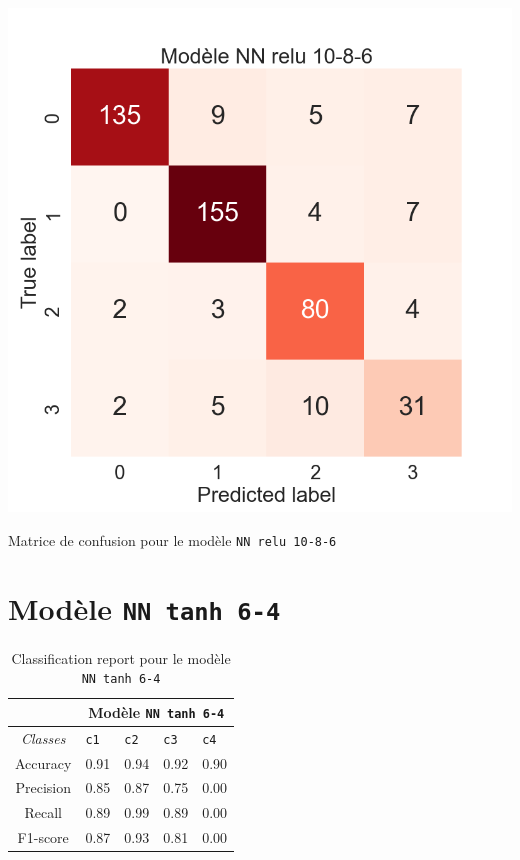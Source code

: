 \begin{table}[H]
    \includegraphics[scale=0.5]{images/y_pred_NN_relu_10-8-6.png}
    \caption{\label{HomePage} Matrice de confusion pour le modèle \texttt{NN relu 10-8-6}}
\end{table}

\newpage

\section{Modèle \texttt{NN tanh 6-4}}

\begin{table}[ht]
  \begin{tabular}{ m{5em} | m{1cm}| m{1cm} | m{1cm}| m{1cm} | } 
  \cline{2-5}
             & \multicolumn{4}{|c|}{Modèle \texttt{NN tanh 6-4}}\\
 \hline
 \multicolumn{1}{|c|}{\textit{Classes}} & \hfil \texttt{c1} & \hfil \texttt{c2} & \hfil \texttt{c3} & \hfil \texttt{c4} \\ 
  \hline
  \multicolumn{1}{|c|}{Accuracy} & \hfil 0.91 & \hfil 0.94 & \hfil 0.92 & \hfil 0.90 \\ 
  \hline
  \multicolumn{1}{|c|}{Precision} & \hfil 0.85 & \hfil 0.87 & \hfil 0.75 & \hfil 0.00 \\ 
  \hline
  \multicolumn{1}{|c|}{Recall} & \hfil 0.89 & \hfil 0.99 & \hfil 0.89 & \hfil 0.00 \\ 
  \hline
  \multicolumn{1}{|c|}{F1-score} & \hfil 0.87 & \hfil 0.93 & \hfil 0.81 & \hfil 0.00 \\ 
  \hline
\end{tabular}
\caption{Classification report pour le modèle \texttt{NN tanh 6-4}}
  \label{Tab:Tcr}
\end{table}

